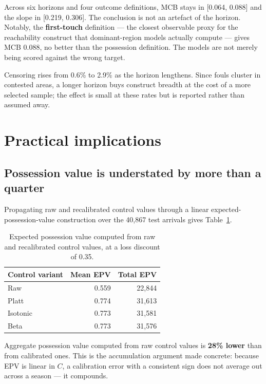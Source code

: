 \documentclass[11pt,a4paper]{article}
\begin{document}
Across six horizons and four outcome definitions, MCB stays in [0.064, 0.088] and
the slope in [0.219, 0.306]. The conclusion is not an artefact of the horizon.
Notably, the \textbf{first-touch} definition --- the closest observable proxy for
the reachability construct that dominant-region models actually compute --- gives
MCB 0.088, no better than the possession definition. The models are not merely
being scored against the wrong target.

Censoring rises from 0.6\% to 2.9\% as the horizon lengthens. Since fouls cluster
in contested areas, a longer horizon buys construct breadth at the cost of a more
selected sample; the effect is small at these rates but is reported rather than
assumed away.

\section{Practical implications}

\subsection{Possession value is understated by more than a quarter}

Propagating raw and recalibrated control values through a linear
expected-possession-value construction over the 40{,}867 test arrivals gives
Table~\ref{tab:epv}.

\begin{table}[h]
\centering
\small
\caption{Expected possession value computed from raw and recalibrated control
values, at a loss discount of 0.35.}
\label{tab:epv}
\begin{tabular}{lrr}
\toprule
Control variant & Mean EPV & Total EPV \\
\midrule
Raw      & 0.559 & 22{,}844 \\
Platt    & 0.774 & 31{,}613 \\
Isotonic & 0.773 & 31{,}581 \\
Beta     & 0.773 & 31{,}576 \\
\bottomrule
\end{tabular}
\end{table}

Aggregate possession value computed from raw control values is \textbf{28\%
lower} than from calibrated ones. This is the accumulation argument made
concrete: because EPV is linear in $C$, a calibration error with a consistent
sign does not average out across a season --- it compounds.
\end{document}
